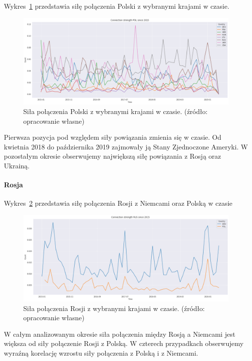 \documentclass[11pt]{report}
\begin{document}
    Wykres~\ref{fig:PLConnection} przedstawia siłę połączenia Polski z wybranymi krajami w czasie.
    \begin{figure}[!htp]
        \centering
        \includegraphics[width=\linewidth]{fig/PL/POLConnection.png}
        \caption{Siła połączenia Polski z wybranymi krajami w czasie. (źródło: opracowanie własne)}
        \label{fig:PLConnection}
    \end{figure}
    Pierwsza pozycja pod względem siły powiązania zmienia się w czasie.
    Od kwietnia 2018 do października 2019 zajmowały ją Stany Zjednoczone Ameryki.
    W pozostałym okresie obserwujemy największą siłę powiązania z Rosją oraz Ukrainą.

    \paragraph{Rosja}

    Wykres~\ref{fig:RUSConnection} przedstawia siłę połączenia Rosji z Niemcami oraz Polską w czasie
    \begin{figure}[!htp]
        \centering
        \includegraphics[width=\linewidth]{fig/RUS/RUSConnection.png}
        \caption{Siła połączenia Rosji z wybranymi krajami w czasie. (źródło: opracowanie własne)}
        \label{fig:RUSConnection}
    \end{figure}
    W całym analizowanym okresie siła połączenia między Rosją a Niemcami jest większa od siły połączenie Rosji z Polską.
    W czterech przypadkach obserwujemy wyraźną korelację wzrostu siły połączenia z Polską i z Niemcami.
\end{document}

